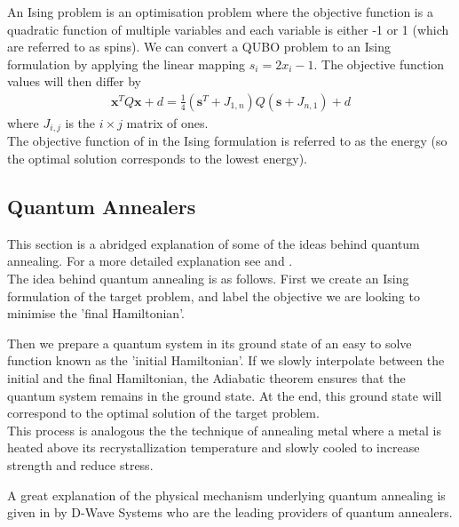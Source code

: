 \documentclass{article}
\begin{document}
\noindent An Ising problem is an optimisation problem where the objective function is a quadratic function of multiple variables and each variable is either -1 or 1 (which are referred to as spins). We can convert a QUBO problem to an Ising formulation by applying the linear mapping \(s_i = 2x_i - 1\). The objective function values will then differ by 
\begin{align*}
    \mathbf{x}^T Q \mathbf{x} + d = \frac{1}{4} (\mathbf{s}^T + J_{1,n})Q(\mathbf{s} + J_{n,1}) + d 
\end{align*} 
where \(J_{i,j}\) is the \(i \times j\) matrix of ones.\\

\noindent The objective function of in the Ising formulation is referred to as the energy (so the optimal solution corresponds to the lowest energy). 

\subsection{Quantum Annealers}

\noindent This section is a abridged explanation of some of the ideas behind quantum annealing. For a more detailed explanation see \cite{tasseff2022emergingpotentialquantumannealing} and \cite{Yarkoni_2022}.\\

\noindent The idea behind quantum annealing is as follows. First we create an Ising formulation of the target problem, and label the objective we are looking to minimise the 'final Hamiltonian'.

\noindent Then we prepare a quantum system in its ground state of an easy to solve function known as the 'initial Hamiltonian'. If we slowly interpolate between the initial and the final Hamiltonian, the Adiabatic theorem \cite{Yarkoni_2022} ensures that the quantum system remains in the ground state. At the end, this ground state will correspond to the optimal solution of the target problem.\\

\noindent This process is analogous the the technique of annealing metal where a metal is heated above its recrystallization temperature and slowly cooled to increase strength and reduce stress.

\noindent A great explanation of the physical mechanism underlying quantum annealing is given in \cite{quantumAnnealingDWave} by D-Wave Systems who are the leading providers of quantum annealers. \\
\end{document}
